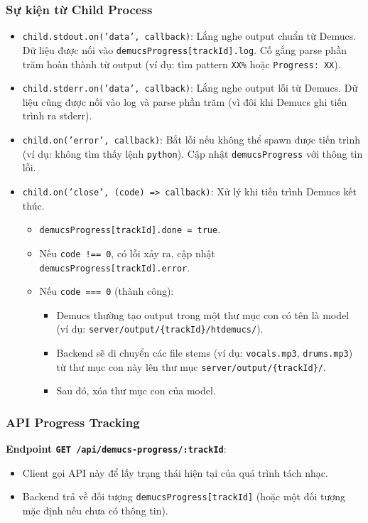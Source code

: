 \documentclass[12pt,a4paper]{article}
\begin{document}
\subsubsection{Sự kiện từ Child Process}
\begin{itemize}
    \item \texttt{child.stdout.on('data', callback)}: Lắng nghe output chuẩn từ Demucs. Dữ liệu được nối vào \texttt{demucsProgress[trackId].log}. Cố gắng parse phần trăm hoàn thành từ output (ví dụ: tìm pattern \texttt{XX\%} hoặc \texttt{Progress: XX}).
    
    \item \texttt{child.stderr.on('data', callback)}: Lắng nghe output lỗi từ Demucs. Dữ liệu cũng được nối vào log và parse phần trăm (vì đôi khi Demucs ghi tiến trình ra stderr).
    
    \item \texttt{child.on('error', callback)}: Bắt lỗi nếu không thể spawn được tiến trình (ví dụ: không tìm thấy lệnh \texttt{python}). Cập nhật \texttt{demucsProgress} với thông tin lỗi.
    
    \item \texttt{child.on('close', (code) => callback)}: Xử lý khi tiến trình Demucs kết thúc.
        \begin{itemize}
            \item \texttt{demucsProgress[trackId].done = true}.
            \item Nếu \texttt{code !== 0}, có lỗi xảy ra, cập nhật \texttt{demucsProgress[trackId].error}.
            \item Nếu \texttt{code === 0} (thành công):
                \begin{itemize}
                    \item Demucs thường tạo output trong một thư mục con có tên là model (ví dụ: \texttt{server/output/\{trackId\}/htdemucs/}).
                    \item Backend sẽ di chuyển các file stems (ví dụ: \texttt{vocals.mp3}, \texttt{drums.mp3}) từ thư mục con này lên thư mục \texttt{server/output/\{trackId\}/}.
                    \item Sau đó, xóa thư mục con của model.
                \end{itemize}
        \end{itemize}
\end{itemize}

\subsubsection{API Progress Tracking}
\textbf{Endpoint \texttt{GET /api/demucs-progress/:trackId}}:
\begin{itemize}
    \item Client gọi API này để lấy trạng thái hiện tại của quá trình tách nhạc.
    \item Backend trả về đối tượng \texttt{demucsProgress[trackId]} (hoặc một đối tượng mặc định nếu chưa có thông tin).
\end{itemize}
\end{document}

